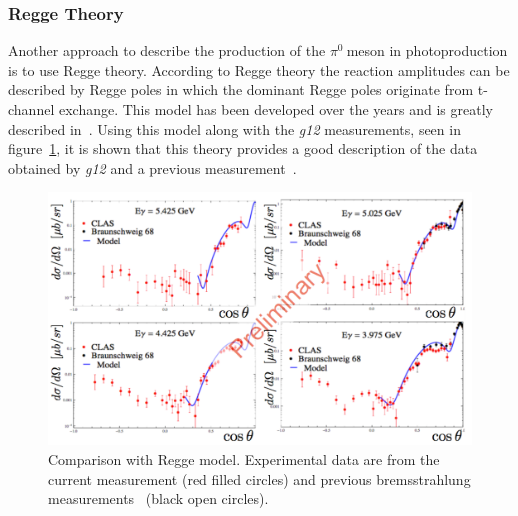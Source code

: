 \documentclass{aip-cp}
\def\g12{\emph{g12}}
\def\piz{$\pi^{0}\ $}
\begin{document}
\subsubsection{Regge Theory}
Another approach to describe the production of the \piz meson in photoproduction is to use Regge theory. According to Regge theory the reaction amplitudes can be described by Regge poles in which the dominant Regge poles originate from t-channel exchange. This model has been developed over the years and is greatly described in~\cite{JPAC}. Using this model along with the \g12 measurements, seen in figure~\ref{fig:pi0_regge}, it is shown that this theory provides a good description of the data obtained by \g12 and a previous measurement~\cite{brem}.
\begin{figure}[h]
	\centerline{\includegraphics[width=275 pt, height = 160 pt]{figures/pi0_regge.pdf}}
	\caption{Comparison with Regge model. Experimental data are from the current measurement (red filled circles) and previous bremsstrahlung measurements~\protect\cite{brem} (black open circles). }
	\label{fig:pi0_regge}
\end{figure}
\end{document}
